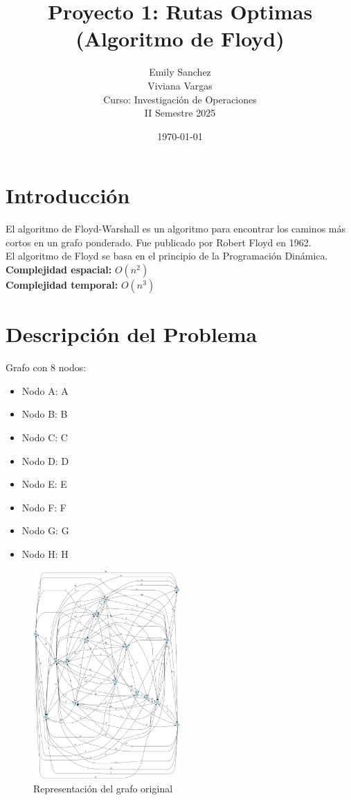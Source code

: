 \documentclass[12pt]{article}
\title{Proyecto 1: Rutas Optimas (Algoritmo de Floyd)}
\author{Emily Sanchez \\ Viviana Vargas \\[1cm] Curso: Investigación de Operaciones \\ II Semestre 2025}
\date{\today}
\begin{document}
\maketitle
\thispagestyle{empty}
\newpage
\setcounter{page}{1}

\section{Introducción}
El algoritmo de Floyd-Warshall es un algoritmo para encontrar los caminos más cortos en un grafo ponderado. Fue publicado por Robert Floyd en 1962.\\
El algoritmo de Floyd se basa en el principio de la Programación Dinámica.\\
\textbf{Complejidad espacial:} $O(n^2)$\\
\textbf{Complejidad temporal:} $O(n^3)$\\
\clearpage
\section{Descripción del Problema}
Grafo con 8 nodos:

\begin{itemize}
\item Nodo A: A
\item Nodo B: B
\item Nodo C: C
\item Nodo D: D
\item Nodo E: E
\item Nodo F: F
\item Nodo G: G
\item Nodo H: H
\end{itemize}

\begin{figure}[h!]
\centering
\includegraphics[width=0.5\textwidth,keepaspectratio]{grafo.png}
\caption{Representación del grafo original}
\end{figure}
\end{document}
